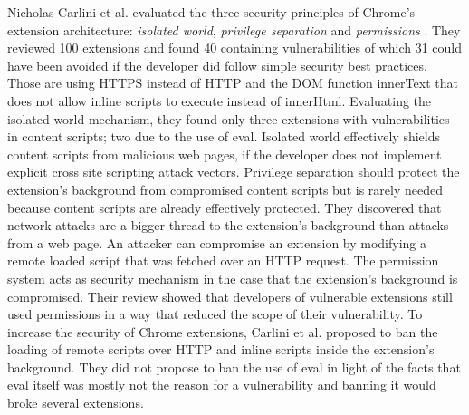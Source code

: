 \documentclass[article,colorback,accentcolor=tud9c,type=bsc]{tudthesis}
\begin{document}
	Nicholas Carlini et al. evaluated the three security principles of Chrome's extension architecture: \textit{isolated world}, \textit{privilege separation} and \textit{permissions} \cite{Carlini:2012:EGC:2362793.2362800}. They reviewed 100 extensions and found 40 containing vulnerabilities of which 31 could have been avoided if the developer did follow simple security best practices. Those are using HTTPS instead of HTTP and the DOM function innerText that does not allow inline scripts to execute instead of innerHtml. Evaluating the isolated world mechanism, they found only three extensions with vulnerabilities in content scripts; two due to the use of eval. Isolated world effectively shields content scripts from malicious web pages, if the developer does not implement explicit cross site scripting attack vectors. Privilege separation should protect the extension's background from compromised content scripts but is rarely needed because content scripts are already effectively protected. They discovered that network attacks are a bigger thread to the extension's background than attacks from a web page. An attacker can compromise an extension by modifying a remote loaded script that was fetched over an HTTP request. The permission system acts as security mechanism in the case that the extension's background is compromised. Their review showed that developers of vulnerable extensions still used permissions in a way that reduced the scope of their vulnerability. To increase the security of Chrome extensions, Carlini et al. proposed to ban the loading of remote scripts over HTTP and inline scripts inside the extension's background. They did not propose to ban the use of eval in light of the facts that eval itself was mostly not the reason for a vulnerability and banning it would broke several extensions. 
	
\end{document}
